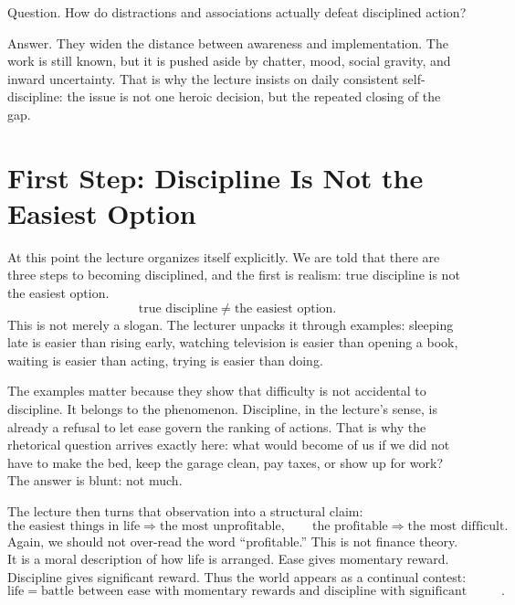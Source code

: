 Question. How do distractions and associations actually defeat disciplined action?

Answer. They widen the distance between awareness and implementation. The work is still known, but it is pushed aside by chatter, mood, social gravity, and inward uncertainty. That is why the lecture insists on daily consistent self-discipline: the issue is not one heroic decision, but the repeated closing of the gap.

\section{First Step: Discipline Is Not the Easiest Option}

At this point the lecture organizes itself explicitly. We are told that there are three steps to becoming disciplined, and the first is realism: true discipline is not the easiest option.
\begin{equation}
\text{true discipline} \neq \text{the easiest option}.
\end{equation}
This is not merely a slogan. The lecturer unpacks it through examples: sleeping late is easier than rising early, watching television is easier than opening a book, waiting is easier than acting, trying is easier than doing.

The examples matter because they show that difficulty is not accidental to discipline. It belongs to the phenomenon. Discipline, in the lecture's sense, is already a refusal to let ease govern the ranking of actions. That is why the rhetorical question arrives exactly here: what would become of us if we did not have to make the bed, keep the garage clean, pay taxes, or show up for work? The answer is blunt: not much.

The lecture then turns that observation into a structural claim:
\begin{equation}
\text{the easiest things in life} \Rightarrow \text{the most unprofitable}, \qquad
\text{the profitable} \Rightarrow \text{the most difficult}.
\end{equation}
Again, we should not over-read the word ``profitable.'' This is not finance theory. It is a moral description of how life is arranged. Ease gives momentary reward. Discipline gives significant reward. Thus the world appears as a continual contest:
\begin{equation}
\text{life} = \text{battle between ease with momentary rewards and discipline with significant rewards}.
\end{equation}

